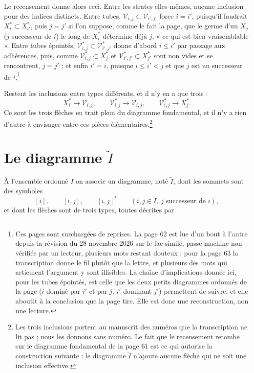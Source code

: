 \documentclass[11pt,a4paper]{article}
\begin{document}
Le recensement donne alors ceci. Entre les strates elles-mêmes, aucune inclusion
pour des indices distincts. Entre tubes, $\mathcal{V}_{i,j} \subset
\mathcal{V}_{i',j'}$ force $i = i'$, puisqu'il faudrait $X_{i}^{*} \subset
X_{i'}^{*}$, puis $j = j'$ si l'on suppose, comme le fait la page, que le
germe d'un $X_{j}$ ($j$ successeur de $i$) le long de $X_{i}^{*}$ détermine
déjà $j$, « ce qui est bien vraisemblable ». Entre tubes épointés, $\mathcal{V}^{*}_{i,j} \subset
\mathcal{V}^{*}_{i',j'}$ donne d'abord $i \leq i'$ par passage aux adhérences,
puis, comme $\mathcal{V}^{*}_{i,j} \subset X_{j}^{*}$ et
$\mathcal{V}^{*}_{i',j'} \subset X_{j'}^{*}$ sont non vides et se rencontrent,
$j = j'$ ; et enfin $i' = i$, puisque $i \leq i' < j$ et que $j$ est un
successeur de $i$.\footnote{Ces pages sont surchargées de reprises. La
page 62 est lue d'un bout à l'autre depuis la révision du 28 novembre 2026 sur
le fac-similé, passe machine non vérifiée par un lecteur, plusieurs mots
restant douteux ; pour la page 63 la transcription donne le fil plutôt que la
lettre, et plusieurs des mots qui articulent l'argument y sont illisibles. La
chaîne d'implications donnée ici, pour les tubes épointés, est
celle que les deux petits diagrammes ordonnés de la page ($i$ dominé par $i'$ et
par $j$, $i'$ dominant $j'$) permettent de suivre, et elle aboutit à la
conclusion que la page tire. Elle est donc une reconstruction, non une lecture.}

Restent les inclusions entre types différents, et il n'y en a que trois :
\[
  X_{i}^{*} \longrightarrow \mathcal{V}_{i,j}, \qquad
  \mathcal{V}^{*}_{i,j} \longrightarrow \mathcal{V}_{i,j}, \qquad
  \mathcal{V}^{*}_{i,j} \longrightarrow X_{j}^{*}.
\]
Ce sont les trois flèches en trait plein du diagramme fondamental, et il n'y a
rien d'autre à envisager entre ces pièces élémentaires.\footnote{Les trois
inclusions portent au manuscrit des numéros que la transcription ne lit pas ;
nous les donnons sans numéro. Le fait que le recensement retombe sur
le diagramme fondamental de la page 61 est ce qui autorise la construction
suivante : le diagramme $\widetilde{I}$ n'ajoute aucune flèche qui ne soit une
inclusion effective.}

\section*{Le diagramme $\widetilde{I}$}

À l'ensemble ordonné $I$ on associe un diagramme, noté $\widetilde{I}$, dont les
sommets sont des symboles
\[
  [i], \qquad [i,j], \qquad [i,j]^{*}
  \qquad (i,j \in I,\ j \text{ successeur de } i),
\]
et dont les flèches sont de trois types, toutes décrites par
\end{document}
